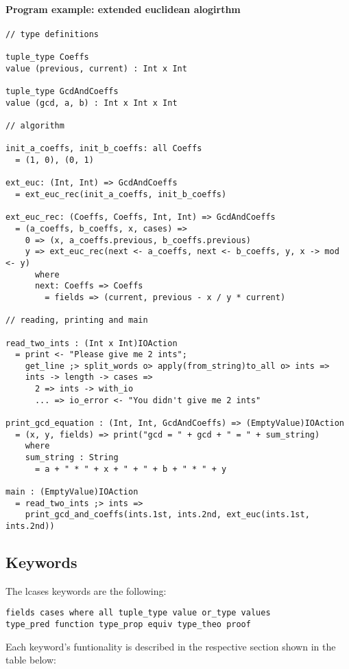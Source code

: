 \documentclass{article}
\begin{document}
\paragraph{Program example: extended euclidean alogirthm}
\begin{verbatim}
// type definitions

tuple_type Coeffs
value (previous, current) : Int x Int

tuple_type GcdAndCoeffs
value (gcd, a, b) : Int x Int x Int

// algorithm

init_a_coeffs, init_b_coeffs: all Coeffs
  = (1, 0), (0, 1)

ext_euc: (Int, Int) => GcdAndCoeffs
  = ext_euc_rec(init_a_coeffs, init_b_coeffs)

ext_euc_rec: (Coeffs, Coeffs, Int, Int) => GcdAndCoeffs
  = (a_coeffs, b_coeffs, x, cases) =>
    0 => (x, a_coeffs.previous, b_coeffs.previous)
    y => ext_euc_rec(next <- a_coeffs, next <- b_coeffs, y, x -> mod <- y)
      where
      next: Coeffs => Coeffs
        = fields => (current, previous - x / y * current)

// reading, printing and main

read_two_ints : (Int x Int)IOAction
  = print <- "Please give me 2 ints";
    get_line ;> split_words o> apply(from_string)to_all o> ints =>
    ints -> length -> cases =>
      2 => ints -> with_io
      ... => io_error <- "You didn't give me 2 ints"
 
print_gcd_equation : (Int, Int, GcdAndCoeffs) => (EmptyValue)IOAction
  = (x, y, fields) => print("gcd = " + gcd + " = " + sum_string)
    where
    sum_string : String
      = a + " * " + x + " + " + b + " * " + y

main : (EmptyValue)IOAction
  = read_two_ints ;> ints =>
    print_gcd_and_coeffs(ints.1st, ints.2nd, ext_euc(ints.1st, ints.2nd))
\end{verbatim}

\subsection{Keywords}

The lcases keywords are the following:
\begin{verbatim}
fields cases where all tuple_type value or_type values
type_pred function type_prop equiv type_theo proof
\end{verbatim}
Each keyword's funtionality is described in the respective section shown in the 
table below:
\end{document}
